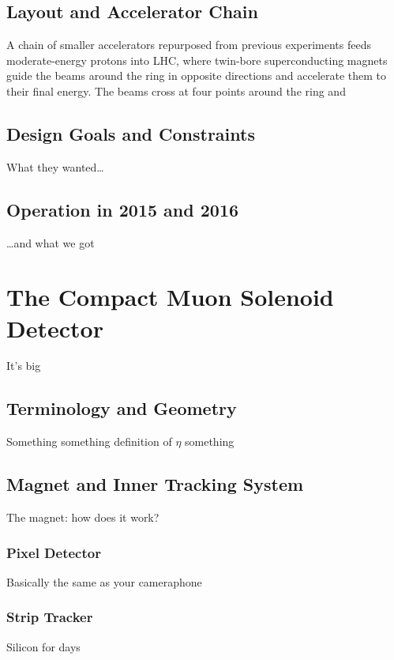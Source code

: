 \subsection{Layout and Accelerator Chain}
A chain of smaller accelerators repurposed from previous experiments feeds moderate-energy protons into LHC, where twin-bore superconducting magnets guide the beams around the ring in opposite directions and accelerate them to their final energy. The beams cross at four points around the ring and


\subsection{Design Goals and Constraints}
What they wanted\ldots


\subsection{Operation in 2015 and 2016}
\ldots and what we got




\section{The Compact Muon Solenoid Detector}
It's big~\cite{Chatrchyan:2008zzk}

\subsection{Terminology and Geometry}
Something something definition of $\eta$ something


\subsection{Magnet and Inner Tracking System}

The magnet: how does it work?

\subsubsection{Pixel Detector}
Basically the same as your cameraphone

\subsubsection{Strip Tracker}
Silicon for days


